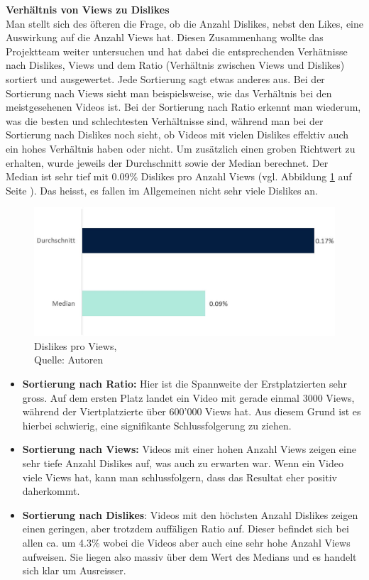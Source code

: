 \documentclass[12pt,titlepage]{article}
\begin{document}
\textbf{Verhältnis von Views zu Dislikes}\\
Man stellt sich des öfteren die Frage, ob die Anzahl Dislikes, nebst den Likes, eine Auswirkung auf die Anzahl Views hat. Diesen Zusammenhang wollte das Projektteam weiter untersuchen und hat dabei die entsprechenden Verhätnisse nach Dislikes, Views und dem Ratio (Verhältnis zwischen Views und Dislikes) sortiert und ausgewertet. Jede Sortierung sagt etwas anderes aus. Bei der Sortierung nach Views sieht man beispielsweise, wie das Verhältnis bei den meistgesehenen Videos ist. Bei der Sortierung nach Ratio erkennt man wiederum, was die besten und schlechtesten Verhältnisse sind, während man bei der Sortierung nach Dislikes noch sieht, ob Videos mit vielen Dislikes effektiv auch ein hohes Verhältnis haben oder nicht. Um zusätzlich einen groben Richtwert zu erhalten, wurde jeweils der Durchschnitt sowie der Median berechnet. Der Median ist sehr tief mit 0.09\% Dislikes pro Anzahl Views (vgl. Abbildung \ref{img:Dislikes pro Views} auf Seite \pageref{img:Dislikes pro Views}). Das heisst, es fallen im Allgemeinen nicht sehr viele Dislikes an.
\begin{figure}[h]
	\centering
	\includegraphics[width=12cm]{IMG/grafik_dislikesviews.JPG}
	\caption[Dislikes pro Views]{Dislikes pro Views,\\ Quelle: Autoren}
	\label{img:Dislikes pro Views}
\end{figure}

\begin{itemize}
\item \textbf{Sortierung nach Ratio:} Hier ist die Spannweite der Erstplatzierten sehr gross. Auf dem ersten Platz landet ein Video mit gerade einmal 3000 Views, während der Viertplatzierte über 600'000 Views hat. Aus diesem Grund ist es hierbei schwierig, eine signifikante Schlussfolgerung zu ziehen.
\item \textbf{Sortierung nach Views:} Videos mit einer hohen Anzahl Views zeigen eine sehr tiefe Anzahl Dislikes auf, was auch zu erwarten war. Wenn ein Video viele Views hat, kann man schlussfolgern, dass das Resultat eher positiv daherkommt. 
\item \textbf{Sortierung nach Dislikes}: Videos mit den höchsten Anzahl Dislikes zeigen einen geringen, aber trotzdem auffäligen Ratio auf. Dieser befindet sich bei allen ca. um 4.3\% wobei die Videos aber auch eine sehr hohe Anzahl Views aufweisen. Sie liegen also massiv über dem Wert des Medians und es handelt sich klar um Ausreisser. 
\end{itemize}
\end{document}

